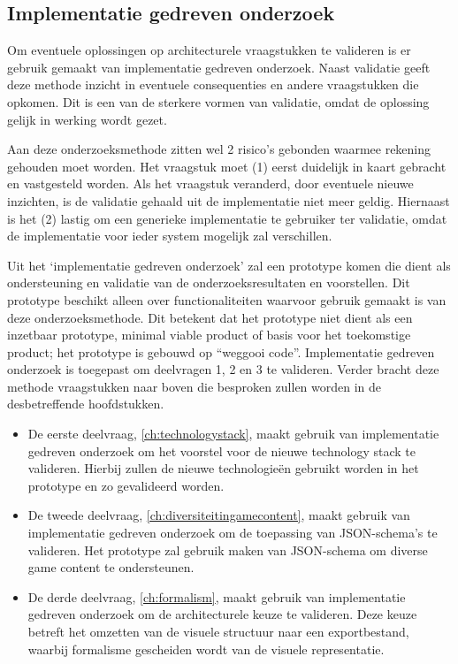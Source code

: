\subsection{Implementatie gedreven onderzoek}
Om eventuele oplossingen op architecturele vraagstukken te valideren is er gebruik gemaakt van implementatie gedreven onderzoek. Naast validatie geeft deze methode inzicht in eventuele consequenties en andere vraagstukken die opkomen. Dit is een van de sterkere vormen van validatie, omdat de oplossing gelijk in werking wordt gezet.

Aan deze onderzoeksmethode zitten wel 2 risico’s gebonden waarmee rekening gehouden moet worden\cite{ResearchSkillsInComputerScience}. Het vraagstuk moet (1) eerst duidelijk in kaart gebracht en vastgesteld worden. Als het vraagstuk veranderd, door eventuele nieuwe inzichten, is de validatie gehaald uit de implementatie niet meer geldig. Hiernaast is het (2) lastig om een generieke implementatie te gebruiker ter validatie, omdat de implementatie voor ieder system mogelijk zal verschillen.

Uit het ‘implementatie gedreven onderzoek’ zal een prototype komen die dient als ondersteuning en validatie van de onderzoeksresultaten en voorstellen. Dit prototype beschikt alleen over functionaliteiten waarvoor gebruik gemaakt is van deze onderzoeksmethode. Dit betekent dat het prototype niet dient als een inzetbaar prototype, minimal viable product of basis voor het toekomstige product; het prototype is gebouwd op “weggooi code”.
Implementatie gedreven onderzoek is toegepast om deelvragen 1, 2 en 3 te valideren. Verder bracht deze methode vraagstukken naar boven die besproken zullen worden in de desbetreffende hoofdstukken.

\begin{itemize}
    \item De eerste deelvraag, \autoref{ch:technologystack}, maakt gebruik van implementatie gedreven onderzoek om het voorstel voor de nieuwe technology stack te valideren. Hierbij zullen de nieuwe technologieën gebruikt worden in het prototype en zo gevalideerd worden.
    \item De tweede deelvraag, \autoref{ch:diversiteitingamecontent}, maakt gebruik van implementatie gedreven onderzoek om de toepassing van JSON-schema’s te valideren. Het prototype zal gebruik maken van JSON-schema om diverse game content te ondersteunen.
    \item De derde deelvraag, \autoref{ch:formalism}, maakt gebruik van implementatie gedreven onderzoek om de architecturele keuze te valideren. Deze keuze betreft het omzetten van de visuele structuur naar een exportbestand, waarbij formalisme gescheiden wordt van de visuele representatie.
\end{itemize}
    
